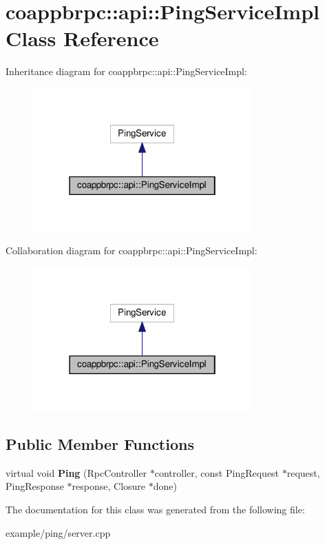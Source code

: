 \hypertarget{classcoappbrpc_1_1api_1_1PingServiceImpl}{}\section{coappbrpc\+:\+:api\+:\+:Ping\+Service\+Impl Class Reference}
\label{classcoappbrpc_1_1api_1_1PingServiceImpl}


Inheritance diagram for coappbrpc\+:\+:api\+:\+:Ping\+Service\+Impl\+:\nopagebreak
\begin{figure}[H]
\begin{center}
\leavevmode
\includegraphics[width=238pt]{classcoappbrpc_1_1api_1_1PingServiceImpl__inherit__graph}
\end{center}
\end{figure}


Collaboration diagram for coappbrpc\+:\+:api\+:\+:Ping\+Service\+Impl\+:\nopagebreak
\begin{figure}[H]
\begin{center}
\leavevmode
\includegraphics[width=238pt]{classcoappbrpc_1_1api_1_1PingServiceImpl__coll__graph}
\end{center}
\end{figure}
\subsection*{Public Member Functions}
\begin{DoxyCompactItemize}
\item 
\mbox{\label{classcoappbrpc_1_1api_1_1PingServiceImpl_ad0fdead8e69607ba9114b277fe96844b}} 
virtual void {\bfseries Ping} (Rpc\+Controller $\ast$controller, const Ping\+Request $\ast$request, Ping\+Response $\ast$response, Closure $\ast$done)
\end{DoxyCompactItemize}


The documentation for this class was generated from the following file\+:\begin{DoxyCompactItemize}
\item 
example/ping/server.\+cpp\end{DoxyCompactItemize}
